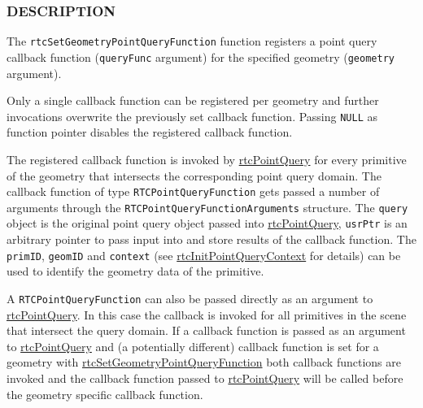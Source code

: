 \subsubsection{DESCRIPTION}\label{description}

The \texttt{rtcSetGeometryPointQueryFunction} function registers a point
query callback function (\texttt{queryFunc} argument) for the specified
geometry (\texttt{geometry} argument).

Only a single callback function can be registered per geometry and
further invocations overwrite the previously set callback function.
Passing \texttt{NULL} as function pointer disables the registered
callback function.

The registered callback function is invoked by
\hyperref[rtcpointquery]{rtcPointQuery} for every primitive of the
geometry that intersects the corresponding point query domain. The
callback function of type \texttt{RTCPointQueryFunction} gets passed a
number of arguments through the \texttt{RTCPointQueryFunctionArguments}
structure. The \texttt{query} object is the original point query object
passed into \hyperref[rtcpointquery]{rtcPointQuery}, \texttt{usrPtr} is
an arbitrary pointer to pass input into and store results of the
callback function. The \texttt{primID}, \texttt{geomID} and
\texttt{context} (see
\hyperref[rtcinitpointquerycontext]{rtcInitPointQueryContext} for
details) can be used to identify the geometry data of the primitive.

A \texttt{RTCPointQueryFunction} can also be passed directly as an
argument to \hyperref[rtcpointquery]{rtcPointQuery}. In this case the
callback is invoked for all primitives in the scene that intersect the
query domain. If a callback function is passed as an argument to
\hyperref[rtcpointquery]{rtcPointQuery} and (a potentially different)
callback function is set for a geometry with
\hyperref[rtcsetgeometrypointqueryfunction]{rtcSetGeometryPointQueryFunction}
both callback functions are invoked and the callback function passed to
\hyperref[rtcpointquery]{rtcPointQuery} will be called before the
geometry specific callback function.

